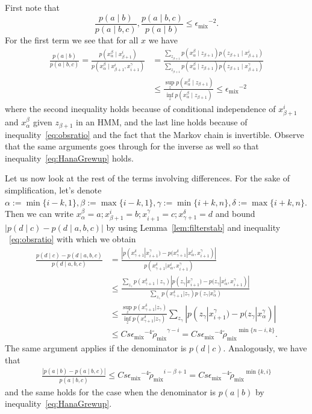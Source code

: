\documentclass[twoside,11pt]{article}
\newcommand{\nstates}{s}
\newcommand{\mixcoefeff}{\ensuremath{\widetilde{\rho}_{\mathrm{mix}}}}
\newcommand{\mixcoefeps}{\ensuremath{\epsilon_{\mathrm{mix}}}}
\begin{document}
First note that 
\begin{equation}
\label{eq:HanaGrewup}
\frac{p(a \mid b)}{p(a \mid b,c)}, \frac{p(a \mid
  b,c)}{p(a\mid b)} \leq \mixcoefeps^{-2}.
\end{equation}
For the first term we see that for all $x$ we have
\begin{align*}
\frac{p(a \mid b)}{p(a\mid b,c )} = \frac{p(x_{\alpha}^\beta\mid x_{\beta+1}^i)}{p(x_{\alpha}^\beta\mid x_{\beta + 1}^i, x_{i+1}^\gamma)} 
&=
\frac{\sum_{z_{\beta+1}}p(x_{\alpha}^\beta \mid z_{\beta+1}) p(z_{\beta+1}\mid x_{\beta+1}^i)}
{\sum_{z_{\beta+1}} p(x_{\alpha}^\beta \mid z_{\beta+1}) p(z_{\beta+1}\mid x_{\beta+1}^\gamma)}\\
%
&\leq 
\frac{\sup_z p(x_{\alpha}^\beta\mid z_{\beta+1})}{\inf_z p(x_{\alpha}^\beta\mid z_{\beta+1})} \leq \mixcoefeps^{-2}
\end{align*}
where the second inequality holds because of conditional independence of 
$x_{\beta+1}^i$ and $x_{\alpha}^\beta$ given $z_{\beta+1}$ in an HMM, and the
 last line holds because of inequality~\eqref{eq:obsratio}
and the fact that the Markov chain is invertible. Observe that
the same arguments goes through for the inverse as well so that 
inequality~\eqref{eq:HanaGrewup} holds.

Let us now look at the rest of the terms involving differences.
For the sake of
simplification, let's denote $\alpha := \min\{i-k,1\}, \beta :=
\max\{i-k,1\}, \gamma := \min\{i+k, n\}, \delta := \max\{i+k, n\}$.
  Then we can write $x_{\alpha}^\beta = a; x_{\beta + 1}^i = b;
  x_{i+1}^\gamma = c; x_{\gamma+1}^\delta = d$ and bound $|p(d\mid c)
  - p(d \mid a,b,c)|$ by using Lemma~\ref{lem:filterstab} and
  inequality ~\eqref{eq:obsratio} with which we obtain
\begin{align*}
\frac{p(d\mid c) - p(d\mid a,b,c)}{p(d\mid a,b,c)} 
&= \frac{|p(x_{\gamma+1}^{\delta}|x_{i+1}^{\gamma}) -
  p(x_{\gamma+1}^{\delta}|x_{\alpha}^{i},
  x_{i+1}^\gamma)|}{p(x_{\gamma+1}^{\delta}|x_{\alpha}^{i},
  x_{i+1}^{\gamma})} \\
&\leq \frac{\sum_{z_{\gamma}}
  p(x_{\gamma+1}^{\delta}\mid
  z_{\gamma})|p(z_{\gamma}|x_{i+1}^{\gamma}) - p(z_{\gamma}|x_{\alpha}^{i}, x_{i+1}^\gamma)|}
 {\sum_{z_{\gamma}} p(x_{\gamma+1}^{\delta}|z_{\gamma}) p(z_{\gamma}|x_{\alpha}^{\gamma})}\\
%
&\leq \frac{\sup_{z}
   p(x_{\gamma+1}^{\delta}|z_{\gamma})}{\inf_{z}p(x_{\gamma+1}^{\delta}|z_{\gamma})}
 \sum_{z_{\gamma}} |p(z_{\gamma}|x_{i+1}^{\gamma}) -
 p(z_{\gamma}|x_{\alpha}^{\gamma})|\\ 
%
&\leq C \nstates
 \mixcoefeps^{-4} \mixcoefeff^{\gamma - i} = C \nstates
 \mixcoefeps^{-4} \mixcoefeff^{\min \{n-i, k\}}.
\end{align*}
%
The same argument applies if the denominator is $p(d \mid c)$.
Analogously, we have that
%
\begin{align*}
\frac{|p(a\mid b) - p(a \mid b,c)|}{p(a\mid b,c)}
\leq C\nstates \mixcoefeps^{-4} \mixcoefeff^{i - \beta+1} 
= C\nstates \mixcoefeps^{-4}\mixcoefeff^{\min\{k, i\}}
\end{align*}
and the same holds for the case when the denominator is $p(a\mid b)$ by
inequality~\eqref{eq:HanaGrewup}.
\end{document}
